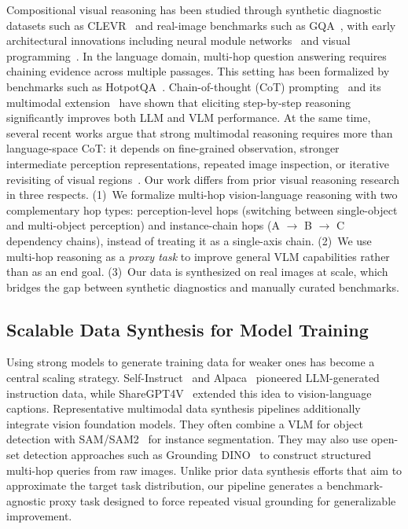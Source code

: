 Compositional visual reasoning has been studied through synthetic diagnostic datasets such as CLEVR~ and real-image benchmarks such as GQA~, with early architectural innovations including neural module networks~ and visual programming~.
In the language domain, multi-hop question answering requires chaining evidence across multiple passages.
This setting has been formalized by benchmarks such as HotpotQA~.
Chain-of-thought (CoT) prompting~ and its multimodal extension~ have shown that eliciting step-by-step reasoning significantly improves both LLM and VLM performance.
At the same time, several recent works argue that strong multimodal reasoning requires more than language-space CoT: it depends on fine-grained observation, stronger intermediate perception representations, repeated image inspection, or iterative revisiting of visual regions~.
Our work differs from prior visual reasoning research in three respects.
(1)~We formalize multi-hop vision-language reasoning with two complementary hop types: perception-level hops (switching between single-object and multi-object perception) and instance-chain hops (A $\rightarrow$ B $\rightarrow$ C dependency chains), instead of treating it as a single-axis chain.
(2)~We use multi-hop reasoning as a \emph{proxy task} to improve general VLM capabilities rather than as an end goal.
(3)~Our data is synthesized on real images at scale, which bridges the gap between synthetic diagnostics and manually curated benchmarks.

\subsection{Scalable Data Synthesis for Model Training}

Using strong models to generate training data for weaker ones has become a central scaling strategy.
Self-Instruct~ and Alpaca~ pioneered LLM-generated instruction data, while ShareGPT4V~ extended this idea to vision-language captions.
Representative multimodal data synthesis pipelines additionally integrate vision foundation models.
They often combine a VLM for object detection with SAM/SAM2~ for instance segmentation.
They may also use open-set detection approaches such as Grounding DINO~ to construct structured multi-hop queries from raw images.
Unlike prior data synthesis efforts that aim to approximate the target task distribution, our pipeline generates a benchmark-agnostic proxy task designed to force repeated visual grounding for generalizable improvement.
